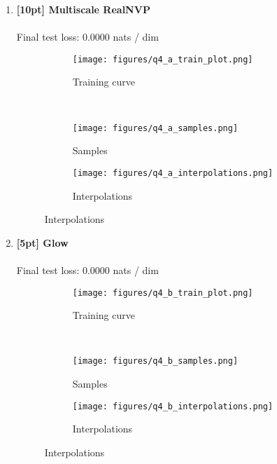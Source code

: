 \documentclass{article}
\begin{document}
\newpage
{}
\begin{enumerate}

\item {\bf [10pt] Multiscale RealNVP} \\\\
Final test loss: 0.0000  nats / dim
\begin{figure}[H]
    \centering
    \begin{subfigure}{0.45\textwidth}
        \centering
        \texttt{[image: figures/q4\_a\_train\_plot.png]}
        \caption{Training curve}
    \end{subfigure}
    \\
    \begin{subfigure}{0.48\textwidth}
        \centering
        \texttt{[image: figures/q4\_a\_samples.png]}
        \caption{Samples}
    \end{subfigure}
    \begin{subfigure}{0.48\textwidth}
        \centering
        \texttt{[image: figures/q4\_a\_interpolations.png]}
        \caption{Interpolations}
    \end{subfigure}
\end{figure}

\newpage
\item {\bf [5pt] Glow} \\\\
Final test loss: 0.0000  nats / dim
\begin{figure}[H]
    \centering
    \begin{subfigure}{0.45\textwidth}
        \centering
        \texttt{[image: figures/q4\_b\_train\_plot.png]}
        \caption{Training curve}
    \end{subfigure}
    \\
    \begin{subfigure}{0.48\textwidth}
        \centering
        \texttt{[image: figures/q4\_b\_samples.png]}
        \caption{Samples}
    \end{subfigure}
    \begin{subfigure}{0.48\textwidth}
        \centering
        \texttt{[image: figures/q4\_b\_interpolations.png]}
        \caption{Interpolations}
    \end{subfigure}
\end{figure}
\end{enumerate}
\end{document}
